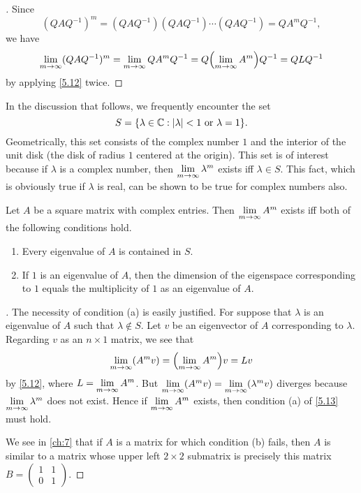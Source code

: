 \begin{proof}[]
  Since
  \[
    (Q A Q^{-1})^m = (Q A Q^{-1}) (Q A Q^{-1}) \cdots (Q A Q^{-1}) = Q A^m Q^{-1},
  \]
  we have
  \[
    \Lim_{m \to \infty} (Q A Q^{-1})^m = \Lim_{m \to \infty} Q A^m Q^{-1} = Q \pa{\Lim_{m \to \infty} A^m} Q^{-1} = Q L Q^{-1}
  \]
  by applying \cref{5.12} twice.
\end{proof}

\begin{defn}\label{5.3.3}
  In the discussion that follows, we frequently encounter the set
  \[
    S = \set{\lambda \in \C : \abs{\lambda} < 1 \text{ or } \lambda = 1}.
  \]
  Geometrically, this set consists of the complex number \(1\) and the interior of the unit disk (the disk of radius \(1\) centered at the origin).
  This set is of interest because if \(\lambda\) is a complex number, then \(\lim\limits_{m \to \infty} \lambda^m\) exists iff \(\lambda \in S\).
  This fact, which is obviously true if \(\lambda\) is real, can be shown to be true for complex numbers also.
\end{defn}

\begin{thm}\label{5.13}
  Let \(A\) be a square matrix with complex entries.
  Then \(\lim\limits_{m \to \infty} A^m\) exists iff both of the following conditions hold.
  \begin{enumerate}
    \item Every eigenvalue of \(A\) is contained in \(S\).
    \item If \(1\) is an eigenvalue of \(A\), then the dimension of the eigenspace corresponding to \(1\) equals the multiplicity of \(1\) as an eigenvalue of \(A\).
  \end{enumerate}
\end{thm}

\begin{proof}[]
  The necessity of condition (a) is easily justified.
  For suppose that \(\lambda\) is an eigenvalue of \(A\) such that \(\lambda \notin S\).
  Let \(v\) be an eigenvector of \(A\) corresponding to \(\lambda\).
  Regarding \(v\) as an \(n \times 1\) matrix, we see that
  \[
    \Lim_{m \to \infty} (A^m v) = \pa{\Lim_{m \to \infty} A^m} v = Lv
  \]
  by \cref{5.12}, where \(L = \lim\limits_{m \to \infty} A^m\).
  But \(\lim\limits_{m \to \infty} (A^m v) = \lim\limits_{m \to \infty} (\lambda^m v)\) diverges because \(\lim\limits_{m \to \infty} \lambda^m\) does not exist.
  Hence if \(\lim\limits_{m \to \infty} A^m\) exists, then condition (a) of \cref{5.13} must hold.

  We see in \cref{ch:7} that if \(A\) is a matrix for which condition (b) fails, then \(A\) is similar to a matrix whose upper left \(2 \times 2\) submatrix is precisely this matrix \(B = \begin{pmatrix}
    1 & 1 \\
    0 & 1
  \end{pmatrix}\).
\end{proof}

